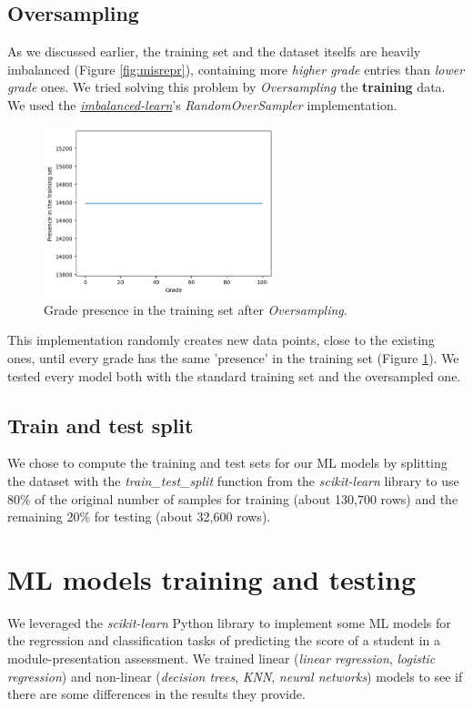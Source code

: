 \documentclass{article}
\begin{document}
\subsection{Oversampling}
\label{subsec:oversamp}
As we discussed earlier, the training set and the dataset itselfs are heavily imbalanced (Figure \ref{fig:misrepr}), containing more \textit{higher grade} entries than \textit{lower grade} ones.
We tried solving this problem by \textit{Oversampling} the \textbf{training} data.
We used the \textit{\href{https://imbalanced-learn.org/stable/references/generated/imblearn.over_sampling.RandomOverSampler.html}{imbalanced-learn}}'s \textit{RandomOverSampler} implementation.
\begin{figure}[ht]
    \centering
    \includegraphics[width=0.6\textwidth]{dataset-presence-over.png}
    \caption{Grade presence in the training set after \textit{Oversampling}.}
    \label{fig:dataset-presence-over}
\end{figure}
This implementation randomly creates new data points, close to the existing ones, until every grade has the same 'presence' in the training set (Figure \ref{fig:dataset-presence-over}).
We tested every model both with the standard training set and the oversampled one.


\subsection{Train and test split}

We chose to compute the training and test sets for our ML models by splitting the dataset with the \textit{train\_test\_split} function from the \textit{scikit-learn} library to use 80\% of the original number of samples for training (about 130,700 rows) and the remaining 20\% for testing (about 32,600 rows).

\section{ML models training and testing}
We leveraged the \textit{scikit-learn} Python library to implement some ML models for the regression and classification tasks of predicting the score of a student in a module-presentation assessment. We trained linear (\textit{linear regression}, \textit{logistic regression}) and non-linear (\textit{decision trees}, \textit{KNN}, \textit{neural networks}) models to see if there are some differences in the results they provide.\\
\end{document}

